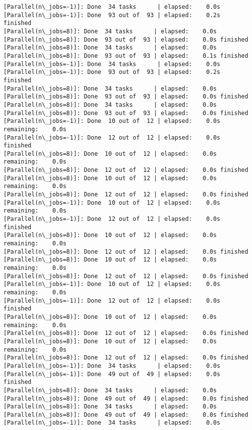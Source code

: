 \documentclass[11pt]{article}
\begin{document}
\begin{Verbatim}[commandchars=\\\{\}]
[Parallel(n\_jobs=-1)]: Done  34 tasks      | elapsed:    0.0s
[Parallel(n\_jobs=-1)]: Done  93 out of  93 | elapsed:    0.2s finished
[Parallel(n\_jobs=8)]: Done  34 tasks      | elapsed:    0.0s
[Parallel(n\_jobs=8)]: Done  93 out of  93 | elapsed:    0.0s finished
[Parallel(n\_jobs=8)]: Done  34 tasks      | elapsed:    0.0s
[Parallel(n\_jobs=8)]: Done  93 out of  93 | elapsed:    0.1s finished
[Parallel(n\_jobs=-1)]: Done  34 tasks      | elapsed:    0.0s
[Parallel(n\_jobs=-1)]: Done  93 out of  93 | elapsed:    0.2s finished
[Parallel(n\_jobs=8)]: Done  34 tasks      | elapsed:    0.0s
[Parallel(n\_jobs=8)]: Done  93 out of  93 | elapsed:    0.0s finished
[Parallel(n\_jobs=8)]: Done  34 tasks      | elapsed:    0.0s
[Parallel(n\_jobs=8)]: Done  93 out of  93 | elapsed:    0.0s finished
[Parallel(n\_jobs=-1)]: Done  10 out of  12 | elapsed:    0.0s remaining:    0.0s
[Parallel(n\_jobs=-1)]: Done  12 out of  12 | elapsed:    0.0s finished
[Parallel(n\_jobs=8)]: Done  10 out of  12 | elapsed:    0.0s remaining:    0.0s
[Parallel(n\_jobs=8)]: Done  12 out of  12 | elapsed:    0.0s finished
[Parallel(n\_jobs=8)]: Done  10 out of  12 | elapsed:    0.0s remaining:    0.0s
[Parallel(n\_jobs=8)]: Done  12 out of  12 | elapsed:    0.0s finished
[Parallel(n\_jobs=-1)]: Done  10 out of  12 | elapsed:    0.0s remaining:    0.0s
[Parallel(n\_jobs=-1)]: Done  12 out of  12 | elapsed:    0.0s finished
[Parallel(n\_jobs=8)]: Done  10 out of  12 | elapsed:    0.0s remaining:    0.0s
[Parallel(n\_jobs=8)]: Done  12 out of  12 | elapsed:    0.0s finished
[Parallel(n\_jobs=8)]: Done  10 out of  12 | elapsed:    0.0s remaining:    0.0s
[Parallel(n\_jobs=8)]: Done  12 out of  12 | elapsed:    0.0s finished
[Parallel(n\_jobs=-1)]: Done  10 out of  12 | elapsed:    0.0s remaining:    0.0s
[Parallel(n\_jobs=-1)]: Done  12 out of  12 | elapsed:    0.0s finished
[Parallel(n\_jobs=8)]: Done  10 out of  12 | elapsed:    0.0s remaining:    0.0s
[Parallel(n\_jobs=8)]: Done  12 out of  12 | elapsed:    0.0s finished
[Parallel(n\_jobs=8)]: Done  10 out of  12 | elapsed:    0.0s remaining:    0.0s
[Parallel(n\_jobs=8)]: Done  12 out of  12 | elapsed:    0.0s finished
[Parallel(n\_jobs=-1)]: Done  34 tasks      | elapsed:    0.0s
[Parallel(n\_jobs=-1)]: Done  49 out of  49 | elapsed:    0.0s finished
[Parallel(n\_jobs=8)]: Done  34 tasks      | elapsed:    0.0s
[Parallel(n\_jobs=8)]: Done  49 out of  49 | elapsed:    0.0s finished
[Parallel(n\_jobs=8)]: Done  34 tasks      | elapsed:    0.0s
[Parallel(n\_jobs=8)]: Done  49 out of  49 | elapsed:    0.0s finished
[Parallel(n\_jobs=-1)]: Done  34 tasks      | elapsed:    0.0s

\end{Verbatim}
\end{document}
